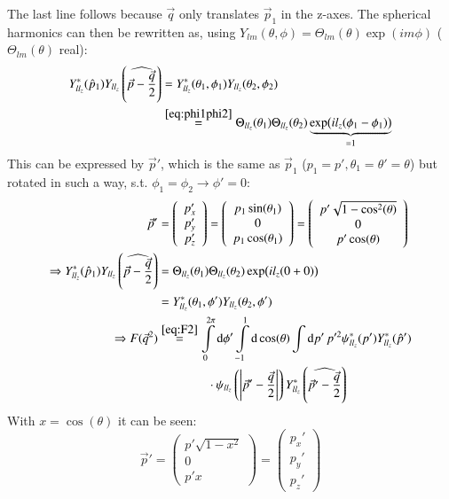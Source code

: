 \documentclass{scrartcl}
\begin{document}
The last line follows because $\vec{q}$ only translates $\vec{p}_1$ in the z-axes.
The spherical harmonics can then be rewritten as, using $Y_{lm}(\theta,\phi)=\Theta_{lm}(\theta)\exp(i m \phi)$ ($\Theta_{lm}(\theta)$ real):
\begin{align}
	Y_{ll_z}^*(\hat{p}_1)Y_{ll_z}\left(\widehat{\vec{p}-\frac{\vec{q}}{2}}\right)&=Y_{ll_z}^*(\theta_1,\phi_1)Y_{ll_z}(\theta_2,\phi_2)\\
	&\overset{\ref{eq:phi1phi2}}{=}\Theta_{ll_z}(\theta_1)\Theta_{ll_z}(\theta_2)\underbrace{\exp(i l_z (\phi_1-\phi_1))}_{\substack{=1}}
\end{align}
This can be expressed by $\vec{p}'$, which is the same  as $\vec{p}_1$ ($p_1=p', \theta_1=\theta'=\theta$) but rotated in such a way, s.t. $\phi_1=\phi_2\rightarrow \phi'=0$:
\begin{align}
	\vec{p}'&=\left(\begin{array}{c}
	p_{x}'\\
	p_{y}'\\
	p_{z}'
	\end{array}\right)=\left(\begin{array}{c}
	p_{1}\sin(\theta_1)\\
	0\\
	p_{1}\cos(\theta_1)
	\end{array}\right)=\left(\begin{array}{c}
	p'\sqrt{1-\cos[2](\theta)}\\
	0\\
	p'\cos(\theta)
	\end{array}\right)\\
	\Rightarrow Y_{ll_z}^*(\hat{p}_1)Y_{ll_z}\left(\widehat{\vec{p}-\frac{\vec{q}}{2}}\right)&=\Theta_{ll_z}(\theta_1)\Theta_{ll_z}(\theta_2) \exp(i l_z(0+0))\\
	&=Y_{ll_z}^*(\theta_1,\phi')Y_{ll_z}(\theta_2,\phi')\\
	\Rightarrow	F(\vec{q}^2)&\overset{\ref{eq:F2}}{=} \int\limits_0^{2\pi} \dd{\phi'}\int\limits_{-1}^{1} \dd{\cos(\theta)}\int\dd{p'} p'^2\psi_{ll_z}^*(p') Y_{ll_z}^*(\hat{p}')\\
	&\qquad\qquad\cdot\psi_{ll_z}\left(\abs{\vec{p}'-\frac{\vec{q}}{2}}\right) Y_{ll_z}^*\left(\widehat{\vec{p}'-\frac{\vec{q}}{2}}\right)
\end{align}
With $x=\cos(\theta)$ it can be seen:
\begin{equation}
	\vec{p}'=\left(\begin{array}{c}
	p'\sqrt{1-x^2}\\
	0\\
	p'x
	\end{array}\right)=\left(\begin{array}{c}
	p_{x}'\\
	p_{y}'\\
	p_{z}'
	\end{array}\right)
\end{equation}
\end{document}
